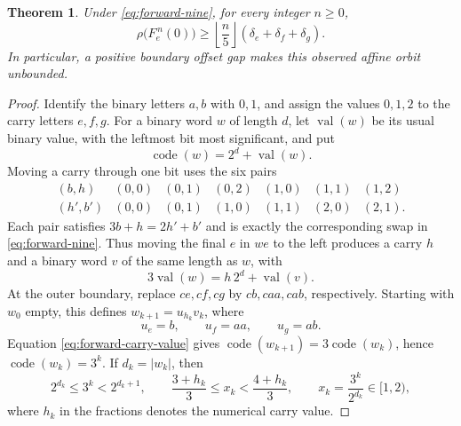 \documentclass[11pt,a4paper]{article}
\newtheorem{theorem}{Theorem}
\begin{document}
\begin{theorem}\label{thm:forward-five-growth}
Under \eqref{eq:forward-nine}, for every integer $n\ge0$,
\begin{equation}\label{eq:forward-five-growth}
 \rho\bigl(F_e^{\,n}(0)\bigr)
 \ge \left\lfloor\frac n5\right\rfloor
       (\delta_e+\delta_f+\delta_g).
\end{equation}
In particular, a positive boundary offset gap makes this observed affine
orbit unbounded.
\end{theorem}

\begin{proof}
Identify the binary letters $a,b$ with $0,1$, and assign the values
$0,1,2$ to the carry letters $e,f,g$. For a binary word $w$ of length
$d$, let $\operatorname{val}(w)$ be its usual binary value, with the
leftmost bit most significant, and put
\[
 \operatorname{code}(w)=2^d+\operatorname{val}(w).
\]
Moving a carry through one bit uses the six pairs
\[
\begin{array}{c|cccccc}
 (b,h)&(0,0)&(0,1)&(0,2)&(1,0)&(1,1)&(1,2)\\
 (h',b')&(0,0)&(0,1)&(1,0)&(1,1)&(2,0)&(2,1).
\end{array}
\]
Each pair satisfies $3b+h=2h'+b'$ and is exactly the corresponding
swap in \eqref{eq:forward-nine}. Thus moving the final $e$ in $we$
to the left produces a carry $h$ and a binary word $v$ of the same
length as $w$, with
\begin{equation}\label{eq:forward-carry-value}
 3\operatorname{val}(w)=h\,2^d+\operatorname{val}(v).
\end{equation}
At the outer boundary, replace $ce,cf,cg$ by $cb,caa,cab$, respectively.
Starting with $w_0$ empty, this defines $w_{k+1}=u_{h_k}v_k$, where
\[
 u_e=b,\qquad u_f=aa,\qquad u_g=ab.
\]
Equation \eqref{eq:forward-carry-value} gives
$\operatorname{code}(w_{k+1})=3\operatorname{code}(w_k)$, hence
$\operatorname{code}(w_k)=3^k$. If $d_k=|w_k|$, then
\[
 2^{d_k}\le3^k<2^{d_k+1},\qquad
 \frac{3+h_k}{3}\le x_k<\frac{4+h_k}{3},
 \qquad x_k=\frac{3^k}{2^{d_k}}\in[1,2),
\]
where $h_k$ in the fractions denotes the numerical carry value.


\end{proof}
\end{document}
